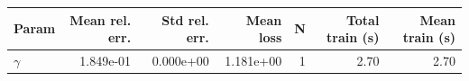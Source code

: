 \begin{tabular}{lrrrrrr}
\hline
Param & Mean rel. err. & Std rel. err. & Mean loss & N & Total train (s) & Mean train (s) \\
\hline
$\gamma$ & 1.849e-01 & 0.000e+00 & 1.181e+00 & 1 & 2.70 & 2.70 \\
\hline
\end{tabular}
